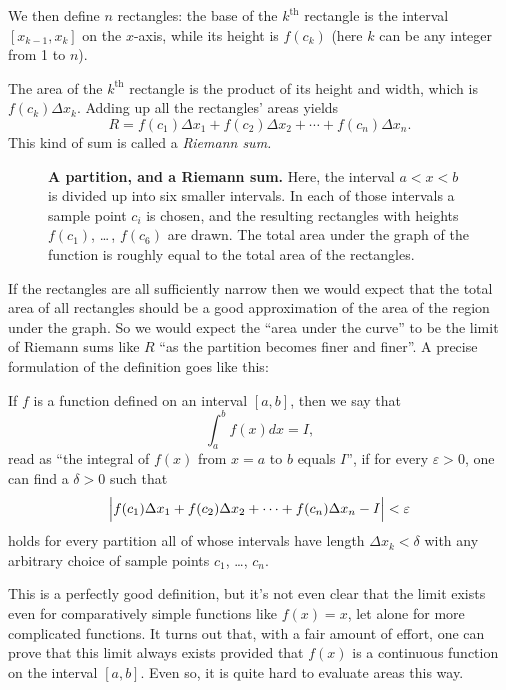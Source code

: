 We then define $n$ rectangles: the base of the $k^{\textrm{th}}$ rectangle is
the interval $[x_{k-1}, x_k]$ on the $x$-axis, while its height is $f(c_k)$
(here $k$ can be any integer from 1 to $n$).

The area of the $k^{\textrm{th}}$ rectangle is the product of its
height and width, which is $f(c_k)\Delta x_k$.  Adding up all the rectangles'
areas yields
\begin{equation}\label{eq:09riemann-sum}
  R = f(c_1)\Delta x_1 + f(c_2) \Delta x_2 + \cdots + f(c_n)\Delta x_n.
\end{equation}
This kind of sum is called a \emph{Riemann sum.}
\begin{figure}[t]
  \centering
  
  \bigskip
  
  \caption{\textbf{A partition, and a Riemann sum. } Here, the interval
    $a<x<b$ is divided up into six smaller intervals.  In each of
    those intervals a sample point $c_i$ is chosen, and the
    resulting rectangles with heights $f(c_1)$, \ldots\,, $f(c_6)$ are
    drawn.  The total area under the graph of the function is roughly
    equal to the total area of the rectangles.  }
  \label{fig:08Riemann}
\end{figure}

If the rectangles are all sufficiently narrow then we would expect that the total
area of all rectangles should be a good approximation of the area of the region
under the graph.  So we would expect the ``area under the curve'' to be the
limit of Riemann sums like $R$ ``as the partition becomes finer and finer''. A
precise formulation of the definition goes like this:

\begin{definition}
  If $f$ is a function defined on an interval $[a, b]$, then we say
  that
  \[
  \int_a^b f(x) dx = I,
  \]
  read as ``the integral of $f(x)$ from $x=a$ to $b$ equals $I$'', if
  for every $\varepsilon >0$, one can find a $\delta>0$ such that
  \[
  \Bigl|f(c_1)\Delta x_1 + f(c_2) \Delta x_2 + \cdots + f(c_n)\Delta
  x_n -I\Bigr|<\varepsilon
  \]
  holds for every partition all of whose intervals have length $\Delta
  x_k<\delta$ with any arbitrary choice of sample points $c_1$, \dots , $c_n$. 
\end{definition}

This is a perfectly good definition, but it's not even clear that the limit
exists even for comparatively simple functions like $f(x)=x$, let alone for more
complicated functions.  It turns out that, with a fair amount of effort, one can
prove that this limit always exists provided that $f(x)$ is a continuous
function on the interval $[a,b]$.  Even so, it is quite hard to evaluate areas
this way.

